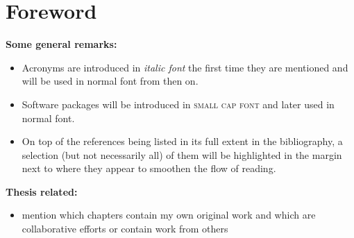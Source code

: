 \chapter*{Foreword}

\textbf{Some general remarks:}
\begin{itemize}
    \item Acronyms are introduced in \textit{italic font} the first time they are mentioned and will be used in normal font from then on.
    \item Software packages will be introduced in \textsc{small cap font} and later used in normal font. 
    \item On top of the references being listed in its full extent in the bibliography, a selection (but not necessarily all) of them will be highlighted in the margin next to where they appear to smoothen the flow of reading.
\end{itemize}


\textbf{Thesis related:}
\begin{itemize}
    \item mention which chapters contain my own original work and which are collaborative efforts or contain work from others
\end{itemize}
